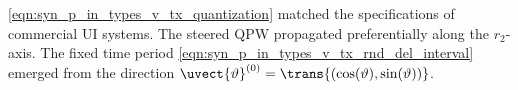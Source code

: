\eqref{eqn:syn_p_in_types_v_tx_quantization} matched
the specifications of
commercial \ac{UI} systems.
The steered \ac{QPW} propagated preferentially along
the $r_{2}$-axis.
%
%
The fixed time period
\eqref{eqn:syn_p_in_types_v_tx_rnd_del_interval} emerged from
the direction
$\uvect{\vartheta}^{(0)} = \trans{ ( \cos( \vartheta ), \sin( \vartheta ) ) }$.
